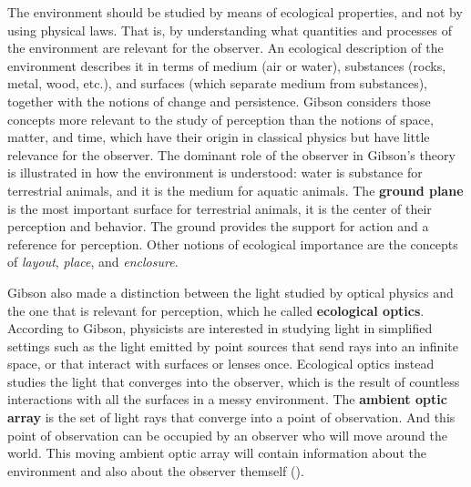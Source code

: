The environment should be studied by means of ecological properties, and not by using physical laws. That is, by understanding what quantities and processes of the environment are relevant for the observer. An ecological description of the environment describes it in terms of medium (air or water), substances (rocks, metal, wood, etc.), and surfaces (which separate medium from substances), together with the notions of change and persistence.
Gibson considers those concepts more relevant to the study of perception than the notions of space, matter, and time, which have their origin in classical physics but have little relevance for the observer. The dominant role of the observer in Gibson's theory is illustrated in how the environment is understood: water is substance for terrestrial animals, and it is the medium for aquatic animals.
The {\bf ground plane}
is the most important surface for terrestrial animals, it is the center of their perception and behavior. The ground provides the support for action and a reference for perception. Other notions of ecological importance are the concepts of {\em layout}, {\em place}, and {\em enclosure}.


Gibson also made a distinction between the light studied by optical physics and the one that is relevant for perception, which he called {\bf ecological optics}.
According to Gibson, physicists are interested in studying light in simplified settings such as the light emitted by point sources that send rays into an infinite space, or that interact with surfaces or lenses once. Ecological optics instead studies the light that converges into the observer, which is the result of countless interactions with all the surfaces in a messy environment. The {\bf ambient optic array} is the set of light rays that converge into a point of observation. And this point of observation can be occupied by an observer who will move around the world. This moving ambient optic array will contain information about the environment and also about the observer themself (\fig{\ref{fig:gibson_bird}}).


